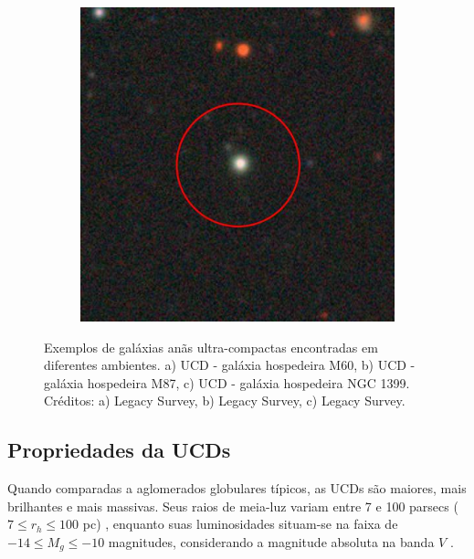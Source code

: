 \begin{figure}[!ht]
\begin{subfigure}[b]{0.3\textwidth}
        \caption{}
    \end{subfigure}
    \begin{subfigure}[b]{0.3\textwidth}
        \includegraphics[width=\textwidth]{Images/ucds_exp/UCD_NGC1399.png}
        \caption{}
    \end{subfigure}
    \caption{Exemplos de galáxias anãs ultra-compactas encontradas em diferentes ambientes. a) UCD - galáxia hospedeira M60, b) UCD - galáxia hospedeira M87, c) UCD - galáxia hospedeira NGC 1399. Créditos: a) Legacy Survey, b) Legacy Survey, c) Legacy Survey.}
    \label{UCDs_exp}
\end{figure}

\subsection{Propriedades da UCDs}\label{subsec:propriedade}
Quando comparadas a aglomerados globulares típicos, as UCDs são maiores, mais brilhantes e mais massivas. Seus raios de meia-luz variam entre 7 e 100 parsecs ($7 \leq r_h \leq 100$ pc) \citep{Mieske_2008_1}, enquanto suas luminosidades situam-se na faixa de $-14 \leq M_g \leq -10$ magnitudes, considerando a magnitude absoluta na banda $V$ \citep{Voggel_2016}.

